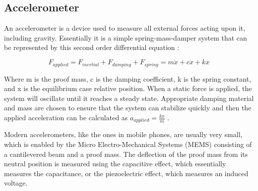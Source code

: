 \subsection{Accelerometer}
An accelerometer is a device used to measure all external forces acting upon it, including gravity. Essentially it is a simple spring-mass-damper system that can be represented by this second order differential equation \cite{dudek2008inertial}:

$$F_{applied} = F_{inertial} + F_{damping} + F_{spring} = m \ddot{x} + c \dot{x} + k x$$

Where m is the proof mass, c is the damping coefficient, k is the spring constant, and x is the equilibrium case relative position. When a static force is applied, the system will oscillate until it reaches a steady state. Appropriate damping material and mass are chosen to ensure that the system can stabilize quickly and then the applied acceleration can be calculated as $a_{applied} = \frac{kx}{m}$ .

Modern accelerometers, like the ones in mobile phones, are usually very small, which is enabled by the Micro Electro-Mechanical Systems (MEMS) consisting of a cantilevered beam and a proof mass. The deflection of the proof mass from its neutral position is measured using the capacitive effect, which essentially measures the capacitance, or the piezoelectric effect, which measures an induced voltage. 

